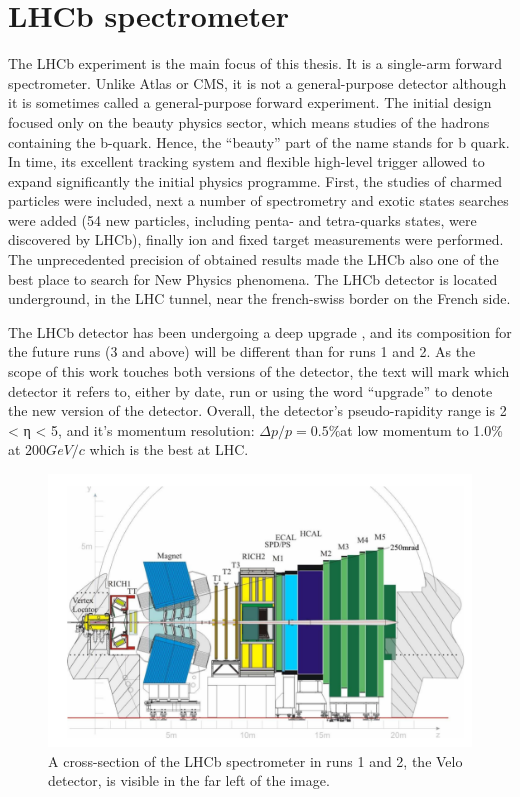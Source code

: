 \section{LHCb spectrometer}

The LHCb\cite{Collaboration_2008} experiment is the main focus of this thesis. It is a single-arm forward spectrometer. Unlike Atlas or CMS, it is not a general-purpose detector although it is sometimes called a general-purpose forward experiment. The initial design focused only on the beauty physics sector, which means studies of the hadrons containing the b-quark. Hence, the ``beauty'' part of the name stands for b quark. In time, its excellent tracking system and flexible high-level trigger allowed to expand significantly the initial physics programme. First, the studies of charmed particles were included, next a number of spectrometry and exotic states searches were added (54 new particles, including penta- and tetra-quarks states, were discovered by LHCb), finally ion and fixed target measurements were performed. The unprecedented precision of obtained results made the LHCb also one of the best place to search for New Physics phenomena. 
The LHCb detector is located underground, in the LHC tunnel, near the french-swiss border on the French side.

The LHCb detector has been undergoing a deep upgrade \cite{CERN-LHCC-2011-001, Bediaga:1443882}, and its composition for the future runs (3 and above) will be different than for runs 1 and 2.
As the scope of this work touches both versions of the detector, the text will mark which detector it refers to, either by date, run or using the word ``upgrade'' to denote the new version of the detector.
Overall, the detector's pseudo-rapidity range is 2 < η < 5, and it's momentum resolution: $Δ p / p = 0.5\%$at low momentum to 1.0\% at $200 GeV/c$ \cite{lhcb_performance_numbers} which is the best at LHC.

\begin{figure}
  \centering
  \includegraphics[width=0.9\linewidth]{figures/chapter2/LHCb.png}
  \caption{A cross-section of the LHCb spectrometer in runs 1 and 2, the Velo detector, is visible in the far left of the image.}
  \label{fig:lhcb}
\end{figure}

